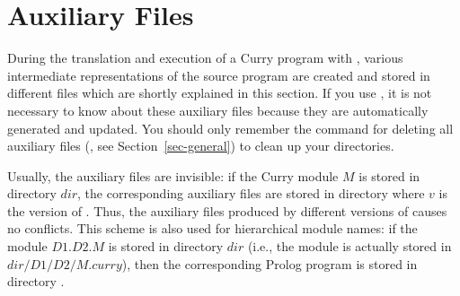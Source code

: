 \section{Auxiliary Files}
\label{sec-auxfiles}

During the translation and execution of a Curry program with \CYS,
various intermediate representations of the source program are created
and stored in different files which are shortly explained in this section.
If you use \CYS, it is not necessary to know about
these auxiliary files because they are automatically generated
and updated. You should only remember the command for deleting
all auxiliary files (, see Section~\ref{sec-general})
to clean up your directories.

Usually, the auxiliary files are invisible:
if the Curry module $M$ is stored in directory $dir$,
the corresponding auxiliary files are stored in directory
 where $v$ is the version of \CYS.
Thus, the auxiliary files produced by different versions of \CYS
causes no conflicts.
This scheme is also used for hierarchical module names:
if the module $D1.D2.M$ is stored in directory $dir$
(i.e., the module is actually stored in $dir/D1/D2/M.curry$),
then the corresponding Prolog program is stored in directory
.

\medskip

